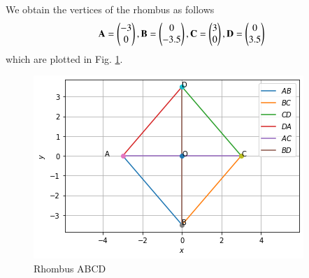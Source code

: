 We obtain the vertices of the rhombus as follows
\begin{align}
\mathbf{A} = \begin{pmatrix}-3\\0\end{pmatrix},
\mathbf{B} = \begin{pmatrix}0\\-3.5\end{pmatrix},
\mathbf{C} = \begin{pmatrix}3\\0\end{pmatrix},
\mathbf{D} = \begin{pmatrix}0\\3.5\end{pmatrix}
\end{align}
which are plotted in Fig. \ref{quad/45/fig:Rhombus ABCD}.
%
\begin{figure}[ht!]
\centering
\includegraphics[width=\columnwidth]{solutions/quad/45/figure2.png}
\caption{Rhombus ABCD}
\label{quad/45/fig:Rhombus ABCD}
\end{figure}

